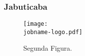 \subsubsection{Jabuticaba}
\label{sec:jabuticaba}
\lipsum[4]

\label{sec:tomate}

\begin{figure}[tb]
  \centering
  \caption{Segunda Figura.}
  \label{fig:segunda-fig}
  \texttt{[image: \\jobname-logo.pdf]}
\end{figure}

 \lipsum[4]


